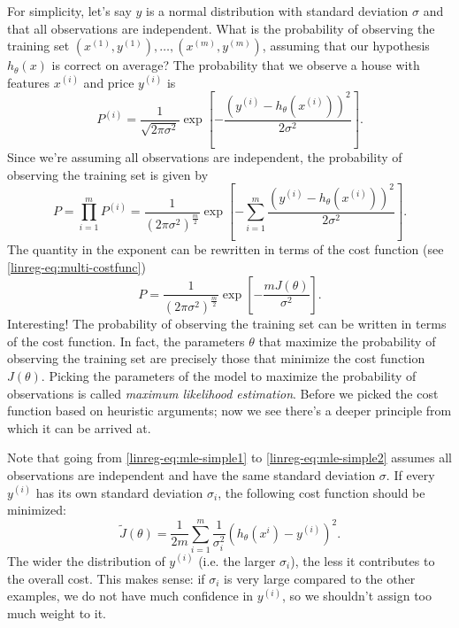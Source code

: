 \documentclass{article}
\theoremstyle{definition}
\begin{document}
For simplicity, let's say $y$ is a normal distribution with standard deviation $\sigma$ and that all observations are independent. What is the probability of observing the training set $(x^{(1)}, y^{(1)}), \dots, (x^{(m)}, y^{(m)})$, assuming that our hypothesis $h_{\theta}(x)$ is correct on average? The probability that we observe a house with features $x^{(i)}$ and price $y^{(i)}$ is
\begin{equation}
    P^{(i)} = \frac{1}{\sqrt{2\pi\sigma^2}}\exp\left[-\frac{(y^{(i)} - h_{\theta}(x^{(i)}))^2}{2\sigma^2}\right].
\end{equation}
Since we're assuming all observations are independent, the probability of observing the training set is given by
\begin{equation}
    P = \prod_{i=1}^mP^{(i)} = \frac{1}{(2\pi\sigma^2)^{\frac{m}{2}}}\exp\left[-\sum_{i=1}^{m}\frac{(y^{(i)} - h_{\theta}(x^{(i)}))^2}{2\sigma^2}\right].
    \label{linreg-eq:mle-simple1}
\end{equation}
The quantity in the exponent can be rewritten in terms of the cost function
(see \eqref{linreg-eq:multi-costfunc})
\begin{equation}
    P = \frac{1}{(2\pi\sigma^2)^{\frac{m}{2}}}\exp\left[-\frac{mJ(\theta)}{\sigma^2}\right].
    \label{linreg-eq:mle-simple2}
\end{equation}
Interesting! The probability of observing the training set can be written in terms of the cost function. In fact, the parameters $\theta$ that maximize the probability of observing the training set are precisely those that minimize the cost function $J(\theta)$. Picking the parameters of the model to maximize the probability of observations is called \textit{maximum likelihood estimation}. Before we picked the cost function based on heuristic arguments; now we see there's a deeper principle from which it can be arrived at.

Note that going from \eqref{linreg-eq:mle-simple1} to \eqref{linreg-eq:mle-simple2} assumes all observations are independent and have the same standard deviation $\sigma$. If every $y^{(i)}$ has its own standard deviation $\sigma_i$, the following cost function should be minimized:
\begin{equation}
    \tilde{J}(\theta) = \frac{1}{2m}\sum_{i=1}^{m}\frac{1}{\sigma_i^2}(h_{\theta}(x^{i}) - y^{(i)})^2.
\end{equation}
The wider the distribution of $y^{(i)}$ (i.e. the larger $\sigma_i$), the less it contributes to the overall cost. This makes sense: if $\sigma_i$ is very large compared to the other examples, we do not have much confidence in $y^{(i)}$, so we shouldn't assign too much weight to it.
\end{document}
